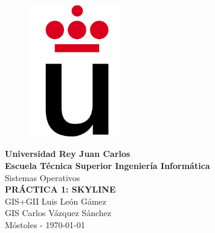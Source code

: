 \setlength{\unitlength}{1 cm} %
\thispagestyle{empty}
\begin{figure}[htb]
\begin{center}
\includegraphics[width=4cm]{./logoURJC}
\end{center}
\end{figure}
\begin{center}
\textbf{{\Huge Universidad Rey Juan Carlos}\\[0.5cm]
{\LARGE Escuela Técnica Superior Ingeniería Informática}}\\[1.25cm]
{\Large Sistemas Operativos}\\[2.3cm]
{\LARGE \textbf{ PRÁCTICA 1: SKYLINE}}\\[3cm]
{\large GIS+GII Luis León Gámez}\\[1cm]
{\large GIS Carlos Vázquez Sánchez}\\[1cm]
Móstoles - \today
\end{center}